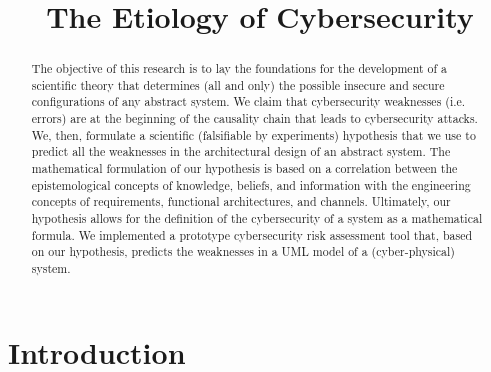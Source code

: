 \documentclass[conference]{IEEEtran}
\begin{document}
\title{The Etiology of Cybersecurity}

\author{
\and
{}
}

\maketitle

\begin{abstract}
	The objective of this research is to lay the foundations for the
	development of a scientific theory that determines (all and only) the possible
	insecure and secure configurations of any abstract system. We claim
	that cybersecurity weaknesses (i.e. errors) are at the beginning of the
	causality chain that leads to cybersecurity attacks.  We, then,
	formulate a scientific (falsifiable by experiments) hypothesis that we
	use to predict all the weaknesses in the architectural design of an
	abstract system. The mathematical formulation of our hypothesis is
	based on a correlation between the epistemological concepts of
	knowledge, beliefs, and information with the engineering concepts of
	requirements, functional architectures, and channels.  Ultimately, our
	hypothesis allows for the definition of the cybersecurity of a system as a
	mathematical formula.  We implemented a prototype cybersecurity risk
	assessment tool that, based on our hypothesis, predicts the weaknesses in a
	UML model of a (cyber-physical) system.
\end{abstract}

\IEEEpeerreviewmaketitle

\section{Introduction}\label{sec:intro}
\end{document}
